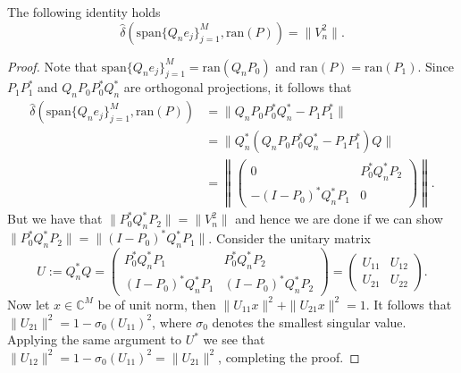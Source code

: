 \documentclass[a4paper,10pt]{article}
\begin{document}
\begin{lemma}
\label{tidy1}
The following identity holds
\begin{equation}
\label{id1}
\hat\delta (\mathrm{span}\{Q_n e_j\}_{j=1}^M,\mathrm{ran}(P))=\|V_n^2\|.
\end{equation}
\end{lemma}
\begin{proof}
Note that $\mathrm{span}\{Q_n e_j\}_{j=1}^M=\mathrm{ran}(Q_nP_0)$ and $\mathrm{ran}(P)=\mathrm{ran}(P_1)$. Since $P_1P_1^*$ and $Q_nP_0P_0^*Q_n^*$ are orthogonal projections, it follows that
\begin{align*}
\hat\delta (\mathrm{span}\{Q_n e_j\}_{j=1}^M,\mathrm{ran}(P))&=\| Q_nP_0P_0^*Q_n^*-P_1P_1^*\|\\
&=\| Q_n^*(Q_nP_0P_0^*Q_n^*-P_1P_1^*)Q\|\\
&=\left\|\left(\begin{matrix}
0      & P_0^*Q_n^*P_2 \\
-(I-P_0)^*Q_n^*P_1  & 0
\end{matrix}\right)\right\|.
\end{align*}
But we have that $\|P_0^*Q_n^*P_2\|=\|V_n^2\|$ and hence we are done if we can show $\|P_0^*Q_n^*P_2\|=\|(I-P_0)^*Q_n^*P_1\|$. Consider the unitary matrix
$$
U:=Q_n^*Q=\left(\begin{matrix}
P_0^*Q_n^*P_1      & P_0^*Q_n^*P_2 \\
(I-P_0)^*Q_n^*P_1  & (I-P_0)^*Q_n^*P_2
\end{matrix}\right)=\left(\begin{matrix}
U_{11}      & U_{12} \\
U_{21}  & U_{22}
\end{matrix}\right).
$$
Now let $x\in\mathbb{C}^{M}$ be of unit norm, then $\|U_{11}x\|^2+\|U_{21}x\|^2=1$. It follows that
$\|U_{21}\|^2=1-\sigma_0(U_{11})^2$, where $\sigma_0$ denotes the smallest singular value. Applying the same argument to $U^*$ we see that $\|U_{12}\|^2=1-\sigma_0(U_{11})^2=\|U_{21}\|^2$, completing the proof.
\end{proof}
\end{document}
